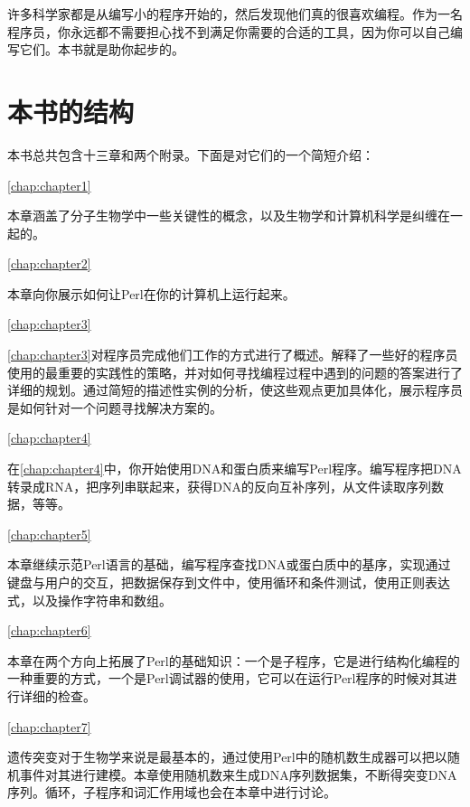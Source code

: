 许多科学家都是从编写小的程序开始的，然后发现他们真的很喜欢编程。作为一名程序员，你永远都不需要担心找不到满足你需要的合适的工具，因为你可以自己编写它们。本书就是助你起步的。

\section*{本书的结构}
本书总共包含十三章和两个附录。下面是对它们的一个简短介绍：

\autoref{chap:chapter1}
\begin{adjustwidth}{1cm}{0cm}
本章涵盖了分子生物学中一些关键性的概念，以及生物学和计算机科学是纠缠在一起的。
\end{adjustwidth}

\autoref{chap:chapter2}
\begin{adjustwidth}{1cm}{0cm}
本章向你展示如何让Perl在你的计算机上运行起来。
\end{adjustwidth}

\autoref{chap:chapter3}
\begin{adjustwidth}{1cm}{0cm}
\autoref{chap:chapter3}对程序员完成他们工作的方式进行了概述。解释了一些好的程序员使用的最重要的实践性的策略，并对如何寻找编程过程中遇到的问题的答案进行了详细的规划。通过简短的描述性实例的分析，使这些观点更加具体化，展示程序员是如何针对一个问题寻找解决方案的。
\end{adjustwidth}

\autoref{chap:chapter4}
\begin{adjustwidth}{1cm}{0cm}
在\autoref{chap:chapter4}中，你开始使用DNA和蛋白质来编写Perl程序。编写程序把DNA转录成RNA，把序列串联起来，获得DNA的反向互补序列，从文件读取序列数据，等等。
\end{adjustwidth}

\autoref{chap:chapter5}
\begin{adjustwidth}{1cm}{0cm}
本章继续示范Perl语言的基础，编写程序查找DNA或蛋白质中的基序，实现通过键盘与用户的交互，把数据保存到文件中，使用循环和条件测试，使用正则表达式，以及操作字符串和数组。
\end{adjustwidth}

\autoref{chap:chapter6}
\begin{adjustwidth}{1cm}{0cm}
本章在两个方向上拓展了Perl的基础知识：一个是子程序，它是进行结构化编程的一种重要的方式，一个是Perl调试器的使用，它可以在运行Perl程序的时候对其进行详细的检查。
\end{adjustwidth}

\autoref{chap:chapter7}
\begin{adjustwidth}{1cm}{0cm}
遗传突变对于生物学来说是最基本的，通过使用Perl中的随机数生成器可以把以随机事件对其进行建模。本章使用随机数来生成DNA序列数据集，不断得突变DNA序列。循环，子程序和词汇作用域也会在本章中进行讨论。
\end{adjustwidth}

